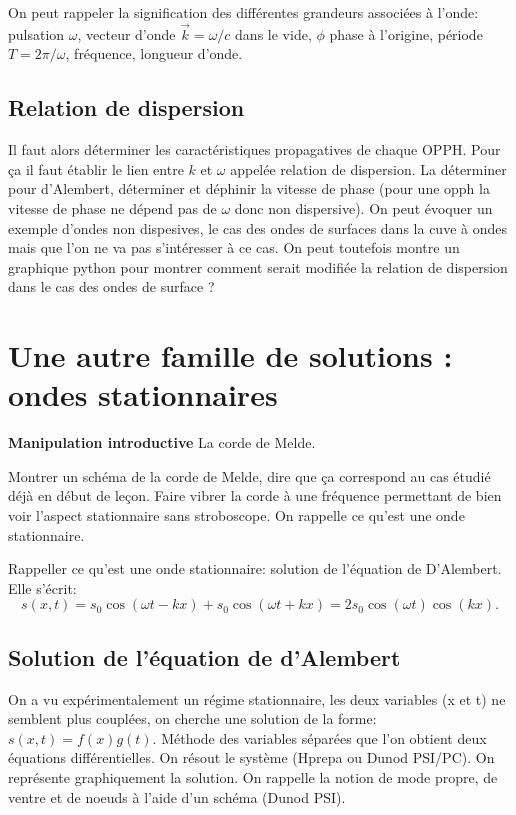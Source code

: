 \documentclass[french, a4paper, 10pt, twocolumn, landscape]{article}
\begin{document}
On peut rappeler la signification des différentes grandeurs associées à l'onde: pulsation $\omega$, vecteur d'onde $\vec{k}=\omega/c$ dans le vide, $\phi$ phase à l'origine, période $T=2\pi/\omega$, fréquence, longueur d'onde. 

\subsection*{Relation de dispersion}

Il faut alors déterminer les caractéristiques propagatives de chaque OPPH. Pour ça il faut établir le lien entre $k$ et $\omega$ appelée relation de dispersion. La déterminer pour d'Alembert, déterminer et déphinir la vitesse de phase (pour une opph la vitesse de phase ne dépend pas de $\omega$ donc non dispersive). On peut évoquer un exemple d'ondes non dispesives, le cas des ondes de surfaces dans la cuve à ondes mais que l'on ne va pas s'intéresser à ce cas. On peut toutefois montre un graphique python pour montrer comment serait modifiée la relation de dispersion dans le cas des ondes de surface ?

\section*{Une autre famille de solutions : ondes stationnaires}

\textbf{Manipulation introductive} La corde de Melde.

Montrer un schéma de la corde de Melde, dire que ça correspond au cas étudié déjà en début de leçon. Faire vibrer la corde à une fréquence permettant de bien voir l'aspect stationnaire sans stroboscope. On rappelle ce qu'est une onde stationnaire. 

Rappeller ce qu'est une onde stationnaire: solution de l'équation de D'Alembert. Elle s'écrit:
\begin{equation}
    s(x,t) = s_0\cos(\omega t-kx)+s_0\cos(\omega t+kx)=2s_0\cos(\omega t)\cos(k x).
\end{equation}

\subsection*{Solution de l'équation de d'Alembert}

On a vu expérimentalement un régime stationnaire, les deux variables (x et t) ne semblent plus couplées, on cherche une solution de la forme: $s(x,t) = f(x)g(t)$. Méthode des variables séparées que l'on obtient deux équations différentielles. On résout le système (Hprepa ou Dunod PSI/PC). On représente graphiquement la solution. On rappelle la notion de mode propre, de ventre et de noeuds à l'aide d'un schéma (Dunod PSI).
\end{document}

